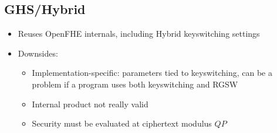 
\subsection{GHS/Hybrid}
\begin{itemize}
    \item Reuses OpenFHE internals, including Hybrid keyswitching settings
    \item Downsides: 
    \begin{itemize}
        \item Implementation-specific: parameters tied to keyswitching, can be a problem if a program uses both keyswitching and RGSW
        \item Internal product not really valid
        \item Security must be evaluated at ciphertext modulus $QP$
    \end{itemize}
\end{itemize}
